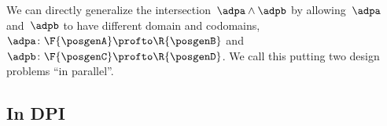 We can directly generalize the intersection~$\adpa \wedge \adpb$ by allowing~$\adpa$ and~$\adpb$ to have different domain and codomains,~$\adpa \colon \F{\posgenA} \profto \R{\posgenB}$ and~$\adpb \colon \F{\posgenC} \profto \R{\posgenD}$.
We call this putting two design problems ``in parallel''.

\subsection{In DPI}\label{subsec:dpi-intersection}

